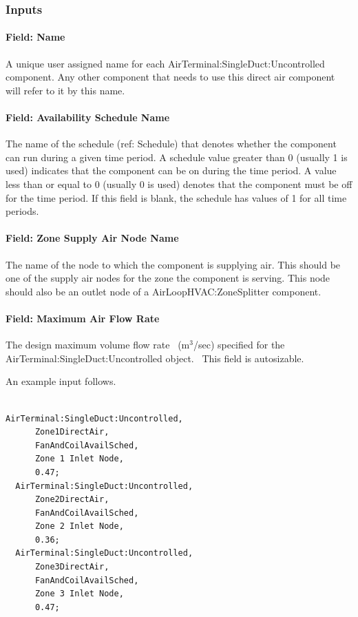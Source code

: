 \subsubsection{Inputs}\label{inputs-001}

\paragraph{Field: Name}\label{field-name-001}

A unique user assigned name for each AirTerminal:SingleDuct:Uncontrolled component. Any other component that needs to use this direct air component will refer to it by this name.

\paragraph{Field: Availability Schedule Name}\label{field-availability-schedule-name}

The name of the schedule (ref: Schedule) that denotes whether the component can run during a given time period. A schedule value greater than 0 (usually 1 is used) indicates that the component can be on during the time period. A value less than or equal to 0 (usually 0 is used) denotes that the component must be off for the time period. If this field is blank, the schedule has values of 1 for all time periods.

\paragraph{Field: Zone Supply Air Node Name}\label{field-zone-supply-air-node-name}

The name of the node to which the component is supplying air. This should be one of the supply air nodes for the zone the component is serving. This node should also be an outlet node of a AirLoopHVAC:ZoneSplitter component.

\paragraph{Field: Maximum Air Flow Rate}\label{field-maximum-air-flow-rate}

The design maximum volume flow rate~ (m\(^{3}\)/sec) specified for the AirTerminal:SingleDuct:Uncontrolled object.~ This field is autosizable.

An example input follows.

\begin{lstlisting}

AirTerminal:SingleDuct:Uncontrolled,
      Zone1DirectAir,
      FanAndCoilAvailSched,
      Zone 1 Inlet Node,
      0.47;
  AirTerminal:SingleDuct:Uncontrolled,
      Zone2DirectAir,
      FanAndCoilAvailSched,
      Zone 2 Inlet Node,
      0.36;
  AirTerminal:SingleDuct:Uncontrolled,
      Zone3DirectAir,
      FanAndCoilAvailSched,
      Zone 3 Inlet Node,
      0.47;
\end{lstlisting}

